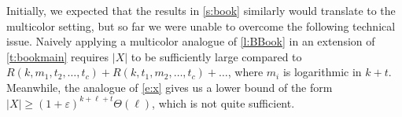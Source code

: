 \documentclass[reqno,final,12pt]{amsart}
\newcommand{\eps}{\varepsilon}
\newcommand{\bl}[1]{\boldsymbol{#1}}
\begin{document}
\vskip 10pt

Initially, we expected that the results in \cref{s:book} similarly would translate to the multicolor setting, but so far we were unable to overcome the following technical issue. Naively applying a multicolor analogue of \cref{l:BBook} in an extension of \cref{t:bookmain} requires $|X|$ to be sufficiently large compared to $R(k, m_1, t_2,\ldots,t_c) + R(k,t_1,m_2,\ldots,t_c) + \ldots$, where $m_i$ is logarithmic in $k+t$.
Meanwhile, the analogue of \eqref{e:x} gives us a lower bound of the form $|X| \geq (1+\eps)^{k+\ell+t}\Theta(\bl{\ell})$, which is not quite sufficient. 




\end{document}
